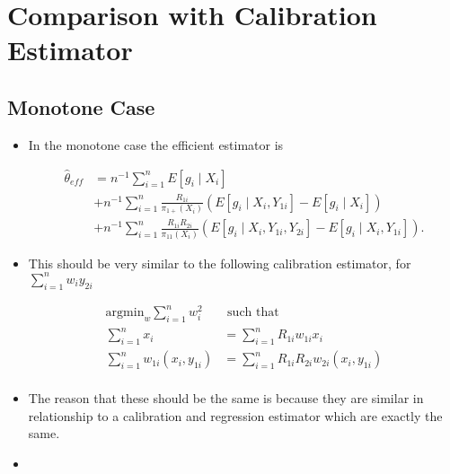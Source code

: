 \documentclass[12pt]{article}
\newcommand{\argmin}{{\text{argmin}}}
\begin{document}

\section*{Comparison with Calibration Estimator}


\subsection*{Monotone Case}

\begin{itemize}
  \item In the monotone case the efficient estimator is 

    \begin{align*}
      \hat \theta_{eff} &= n^{-1} \sum_{i = 1}^n E[g_i \mid X_i] \\
      &+ n^{-1} \sum_{i = 1}^n \frac{R_{1i}}{\pi_{1+}(X_i)}(
        E[g_i \mid X_i, Y_{1i}] - E[g_i \mid X_i]) \\
      &+ n^{-1} \sum_{i = 1}^n \frac{R_{1i} R_{2i}}{\pi_{11}(X_i)} (
      E[g_i \mid X_i, Y_{1i}, Y_{2i}] - E[g_i \mid X_i, Y_{1i}]). 
    \end{align*}

  \item This should be very similar to the following calibration estimator, for
    $\sum_{i = 1}^n w_i y_{2i}$

    \begin{align*}
      \argmin_w \sum_{i = 1}^n w_i^2& \text{ such that }\\
      \sum_{i = 1}^n x_i &= \sum_{i = 1}^n R_{1i} w_{1i} x_i \\
      \sum_{i = 1}^n w_{1i} (x_i, y_{1i}) &= \sum_{i = 1}^n R_{1i} R_{2i} w_{2i}
      (x_i, y_{1i}) \\
    \end{align*}
  
  \item The reason that these should be the same is because they are similar in
    relationship to a calibration and regression estimator which are exactly the
    same.
    
  \item %
\end{itemize}
\end{document}
